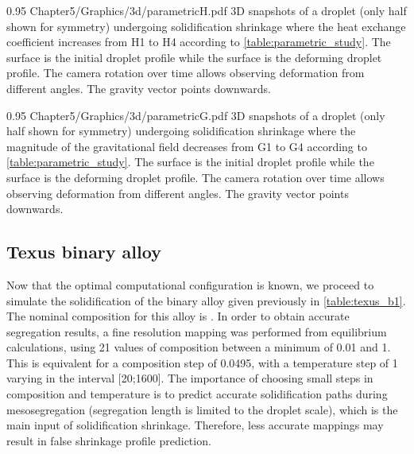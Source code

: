 \begin{figureth}
{0.95}
{Chapter5/Graphics/3d/parametricH.pdf}
{3D snapshots of a droplet (only half shown for symmetry) undergoing solidification shrinkage where the heat exchange coefficient 
increases from H1 to H4 according to \cref{table:parametric_study}. The  surface is the initial droplet profile while the  surface
is the deforming droplet profile. The camera rotation over time allows observing deformation from different angles. The gravity vector points downwards.}
\label{fig:parametricH}
\end{figureth}

\begin{figureth}
{0.95}
{Chapter5/Graphics/3d/parametricG.pdf}
{3D snapshots of a droplet (only half shown for symmetry) undergoing solidification shrinkage where the magnitude of the gravitational field
decreases from G1 to G4 according to \cref{table:parametric_study}. The  surface is the initial droplet profile while the  surface
is the deforming droplet profile. The camera rotation over time allows observing deformation from different angles.
The gravity vector points downwards.}
\label{fig:parametricG}
\end{figureth}


\subsection{Texus binary alloy}

Now that the optimal computational configuration is known, we proceed to simulate the solidification of the binary alloy given previously in \cref{table:texus_b1}. \\
The nominal composition for this alloy is . In order to obtain accurate segregation results, a fine resolution mapping was performed
from equilibrium calculations, using 21 values of composition between a minimum of \SI{0.01}{\ucomposition} and \SI{1}{\ucomposition}. This is 
equivalent for a composition step of \SI{0.0495}{\ucomposition}, with a temperature step of \SI{1}{\udegC} varying in the interval [\SI{20}{\udegC};\SI{1600}{\udegC}].
The importance of choosing small steps in composition and temperature is to predict accurate solidification paths during mesosegregation (segregation length is limited to the droplet scale), 
which is the main input of solidification shrinkage. Therefore, less accurate mappings may result in false shrinkage profile prediction. 

